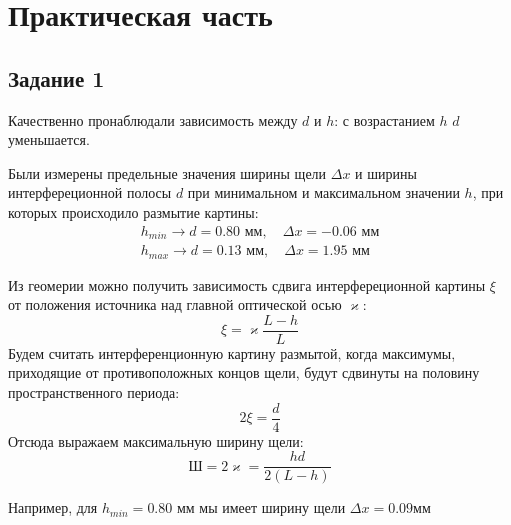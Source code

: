 \section{Практическая часть}
\subsection{Задание 1}
Качественно пронаблюдали зависимость между $d$ и $h$: с возрастанием $h$ $d$ уменьшается.

Были измерены предельные значения ширины щели $\Delta x$ и ширины интерфереционной полосы $d$ при минимальном и максимальном значении $h$, при которых происходило размытие картины: 
\begin{gather*}
h_{min}\to d=0.80\text{ мм}, \quad \Delta x=-0.06\text{ мм}\\
h_{max}\to d=0.13\text{ мм}, \quad \Delta x=1.95\text{ мм} 	
\end{gather*}

Из геомерии можно получить зависимость сдвига интерфереционной картины $\xi$ от положения источника над главной оптической осью $\varkappa$: 
\begin{equation}
	\xi=\varkappa \frac{L-h}{L}
\end{equation}
Будем считать интерференционную картину размытой, когда максимумы, приходящие от противоположных концов щели, будут сдвинуты на половину пространственного периода:	
\begin{equation}
	2\xi=\frac{d}{4}
\end{equation}
Отсюда выражаем максимальную ширину щели:
\begin{equation}
	\text{Ш}=2\varkappa=\frac{hd}{2(L-h)}
\end{equation}

Например, для $h_{min}=0.80\text{ мм}$ мы имеет ширину щели $\Delta x=0.09 \text{мм}$

\newpage
